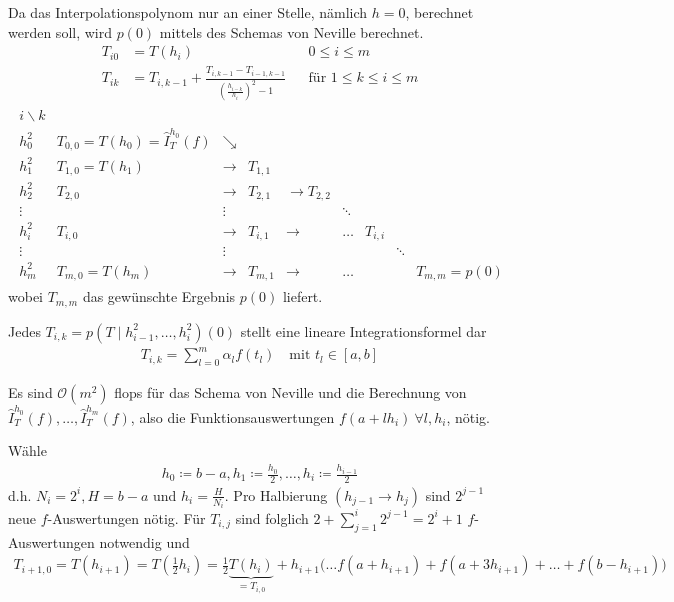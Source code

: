 Da das Interpolationspolynom nur an einer Stelle,
nämlich $h=0$, berechnet werden soll,
wird $p(0)$ mittels des Schemas von Neville berechnet.
\begin{align}\nonumber
  T_{i0} &= T(h_i) &&0\leq i\leq m \\
  T_{ik} &= T_{i,k-1} 
           + \frac{T_{i,k-1}-T_{i-1,k-1}}
           {\left(\frac{h_{i-k}}{h_i}\right)^2-1} 
                   &&\text{für } 1\leq k\leq i\leq m
                      \label{VII.3.6}
\end{align}
\begin{align*}
  \begin{array}{clccccccl}
    i\backslash k \\
    h_0^2 & T_{0,0}=T(h_0)=\hat{I}_T^{h_0}(f) & \searrow \\
    h_1^2 & T_{1,0}=T(h_1) & \longrightarrow & T_{1,1}\\
    h_2^2 & T_{2,0}& \longrightarrow &T_{2,1} & \longrightarrow T_{2,2} \\
    \vdots&&\vdots&&& \ddots\\
    h_i^2 & T_{i,0} & \longrightarrow & T_{i,1} & \longrightarrow & \ldots &
                                                                             T_{i,i}\\
    \vdots&&\vdots&&&&& \ddots\\
    h_m^2 & T_{m,0}=T(h_m)&\longrightarrow & T_{m,1} &\longrightarrow &\ldots&&&T_{m,m}=p(0)
  \end{array}
\end{align*}
wobei $T_{m,m}$ das gewünschte Ergebnis $p(0)$ liefert.

\begin{Beme}\label{7.3.3}
  Jedes $T_{i,k}=p(T\mid h_{i-1}^2,\ldots, h_i^2)(0)$ 
  stellt eine lineare Integrationsformel dar
  \begin{gather*}
    T_{i,k}=\sum_{l=0}^m \alpha_lf(t_l)
    \quad \text{mit } t_l\in[a,b]
  \end{gather*}
\end{Beme}

\label{7.3.4}
Es sind $\mathcal{O}(m^2)$ flops für das Schema von Neville
und die Berechnung von 
$\hat{I}_T^{h_0}(f),\ldots, \hat{I}_T^{h_m}(f)$,
also die Funktionsauswertungen $f(a+lh_i)~\forall l,h_i$,
nötig.

\label{7.3.5}
Wähle 
\begin{gather}
  h_0\coloneqq b-a, 
  h_1\coloneqq \frac{h_0}{2}, \ldots, 
  h_i\coloneqq \frac{h_{i-1}}{2}
  \label{VII.3.7}
\end{gather}
d.h. $N_i=2^i, H=b-a$ und $h_i=\frac{H}{N_i}$.
\label{im7.3.5}
Pro Halbierung $(h_{j-1}\rightarrow h_j)$ sind $2^{j-1}$
neue $f$-Auswertungen nötig.
Für $T_{i,j}$ sind folglich $2+\sum_{j=1}^i2^{j-1}=2^i+1$
$f$-Auswertungen notwendig und
\begin{gather}
  T_{i+1,0}=T(h_{i+1})=T\left(\frac{1}{2}h_i\right)
  =\frac{1}{2}\underbrace{T(h_i)}_{=T_{i,0}}
  + h_{i+1}\big(\ldots f(a+h_{i+1})+f(a+3h_{i+1})+\ldots
  + f(b-h_{i+1})\big)
  \label{VII.3.8}
\end{gather}

